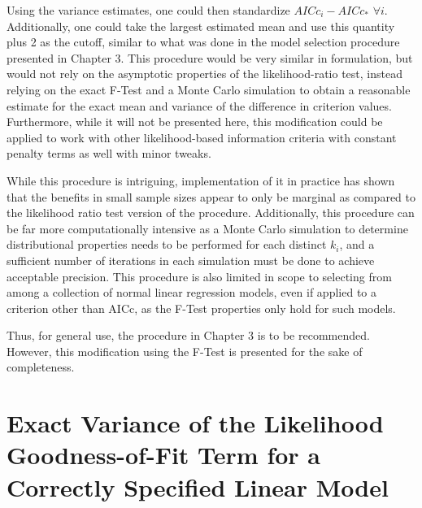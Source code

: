 Using the variance estimates, one could then standardize $AICc_i - AICc_*$ $\forall i$. Additionally, one could take the largest estimated
mean and use this quantity plus 2 as the cutoff, similar to what was done in the model selection procedure presented in Chapter 3. This
procedure would be very similar in formulation, but would not rely on the asymptotic properties of the likelihood-ratio test, instead
relying on the exact F-Test and a Monte Carlo simulation to obtain a reasonable estimate for the exact mean and variance of the difference
in criterion values. Furthermore, while it will not be presented here, this modification could be applied to work with other likelihood-based
information criteria with constant penalty terms as well with minor tweaks.

While this procedure is intriguing, implementation of it in practice has shown that the benefits in small sample sizes appear to only be
marginal as compared to the likelihood ratio test version of the procedure. Additionally, this procedure can be far more computationally
intensive as a Monte Carlo simulation to determine distributional properties needs to be performed for each distinct $k_i$, and a sufficient
number of iterations in each simulation must be done to achieve acceptable precision. This procedure is also limited in scope to selecting
from among a collection of normal linear regression models, even if applied to a criterion other than AICc, as the F-Test properties only hold
for such models.

Thus, for general use, the procedure in Chapter 3 is to be recommended. However, this modification using the F-Test is presented for the
sake of completeness.


\section*{Exact Variance of the Likelihood Goodness-of-Fit Term for a Correctly Specified Linear Model}


